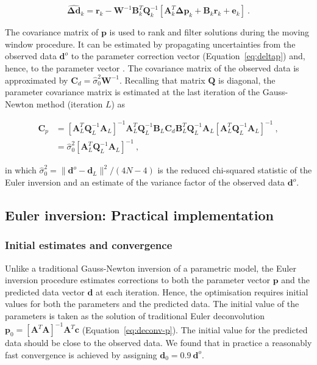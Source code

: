 \begin{equation}
  \hat{\mathbf{\Delta d}}_k =
  \mathbf{r}_k -
  \mathbf{W}^{-1}\mathbf{B}_k^T\mathbf{Q}_k^{-1}
  \left[\mathbf{A}_k^T\mathbf{\Delta p}_k + \mathbf{B}_k\mathbf{r}_k + \mathbf{e}_k\right]
  \ .
  \label{eq:deltad}
\end{equation}

The covariance matrix of $\mathbf{p}$ is used to rank and filter solutions
during the moving window procedure.
It can be estimated by propagating uncertainties from the observed data
$\mathbf{d}^o$ to the
parameter correction vector (Equation~\ref{eq:deltap}) and, hence, to the
parameter vector \citep{WellsKrakiwsky1971}.
The covariance matrix of the observed data is approximated by
$\mathbf{C}_d = \hat{\sigma}_0^2\mathbf{W}^{-1}$.
Recalling that matrix $\mathbf{Q}$ is diagonal,
the parameter covariance matrix is estimated at the last iteration of the
Gauss-Newton method (iteration $L$) as

\begin{equation}
  \begin{aligned}
    \mathbf{C}_{p} &=
      \left[\mathbf{A}_L^T\mathbf{Q}_L^{-1}\mathbf{A}_L\right]^{-1}
      \mathbf{A}_L^T\mathbf{Q}_L^{-1}\mathbf{B}_L
      \mathbf{C}_d
      \mathbf{B}_L^T\mathbf{Q}_L^{-1}\mathbf{A}_L
      \left[\mathbf{A}_L^T\mathbf{Q}_L^{-1}\mathbf{A}_L\right]^{-1}
    \ ,
    \\
    &= \hat{\sigma}_0^2 \left[\mathbf{A}_L^T\mathbf{Q}_L^{-1}\mathbf{A}_L\right]^{-1}
    \ ,
  \end{aligned}
  \label{eq:cov}
\end{equation}

\noindent
in which
$\hat{\sigma}^2_0 = \|\mathbf{d}^o - \mathbf{d}_L\|^2 / (4N - 4)$ is the
reduced chi-squared statistic of the Euler inversion and an estimate of the
variance factor of the observed data $\mathbf{d}^o$.



\subsection{Euler inversion: Practical implementation}

\subsubsection{Initial estimates and convergence}

Unlike a traditional Gauss-Newton inversion of a parametric model, the Euler
inversion procedure estimates corrections to both the parameter vector
$\mathbf{p}$ and the predicted data vector $\mathbf{d}$ at each iteration.
Hence, the optimisation requires initial values for both the parameters and the
predicted data.
The initial value of the parameters is taken as the solution of
traditional Euler deconvolution
$\mathbf{p}_0 = \left[\mathbf{A}^T\mathbf{A}\right]^{-1}\mathbf{A}^T\mathbf{c}$
(Equation~\ref{eq:deconv-p}).
The initial value for the predicted data should be close to the observed data.
We found that in practice a reasonably fast convergence is achieved by
assigning $\mathbf{d}_0 = 0.9\ \mathbf{d}^o$.

